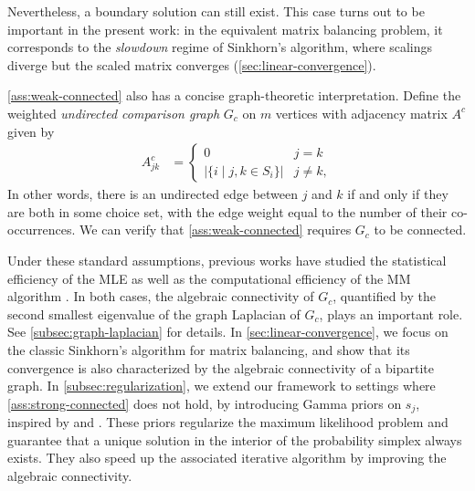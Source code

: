 Nevertheless, a boundary solution can still exist. This case turns out to be important in the present work: in the equivalent matrix balancing problem, it corresponds to the  \emph{slowdown} regime of Sinkhorn's algorithm, where scalings diverge but the scaled matrix converges (\cref{sec:linear-convergence}). 

\cref{ass:weak-connected} also has a concise graph-theoretic interpretation. Define the weighted \emph{undirected comparison graph} $G_c$ on $m$ vertices with adjacency matrix $A^c$ given by 
\begin{align*}
{A}^c_{jk} & =\begin{cases}
0 & j=k\\
|\{i\mid j,k\in S_i\}| & j\neq k,
\end{cases}
\end{align*}
In other words, there is an undirected edge between $j$ and $k$ if and only if they are both in some choice set, with the edge weight equal to the number of their co-occurrences. We can verify that \cref{ass:weak-connected} requires $G_c$ to be connected.

Under these standard assumptions, previous works have studied the statistical efficiency of the MLE \citep{hajek2014minimax,shah2015estimation,seshadri2020learning} as well as the computational efficiency of the MM algorithm \citep{vojnovic2020convergence}. In both cases, the algebraic connectivity of $G_c$, quantified by the second smallest eigenvalue of the graph Laplacian of $G_c$, plays an important role. See \cref{subsec:graph-laplacian} for details.
In \cref{sec:linear-convergence}, we focus on the classic Sinkhorn's algorithm for matrix balancing, and show that its convergence is also characterized by the algebraic connectivity of a bipartite graph. In \cref{subsec:regularization}, we extend our framework to settings where \cref{ass:strong-connected} does not hold, by introducing Gamma priors on $s_j$, inspired by \citet{caron2012efficient} and \citet{maystre2017choicerank}. These priors regularize the maximum likelihood problem and guarantee that a unique solution in the interior of the probability simplex always exists. They also speed up the associated iterative algorithm by improving the algebraic connectivity.

